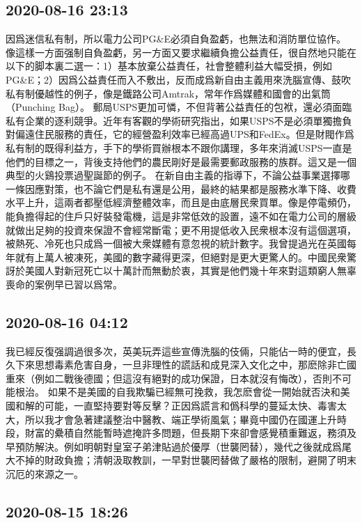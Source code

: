 \documentclass[twocolumn]{ctexart}
\begin{document}
\subsection*{2020-08-16 23:13}

因爲迷信私有制，所以電力公司PG\&E必須自負盈虧，也無法和消防單位協作。
像這樣一方面强制自負盈虧，另一方面又要求繼續負擔公益責任，很自然地只能在以下的脚本裏二選一：1）基本放棄公益責任，社會整體利益大幅受損，例如PG\&E；2）因爲公益責任而入不敷出，反而成爲新自由主義用來洗腦宣傳、鼓吹私有制優越性的例子，像是鐵路公司Amtrak，常年作爲媒體和國會的出氣筒（Punching Bag）。
郵局USPS更加可憐，不但背著公益責任的包袱，還必須面臨私有企業的逐利競爭。近年有客觀的學術研究指出，如果USPS不是必須單獨擔負對偏遠住民服務的責任，它的經營盈利效率已經高過UPS和FedEx。但是財閥作爲私有制的既得利益方，手下的學術買辦根本不跟你講理，多年來消滅USPS一直是他們的目標之一，背後支持他們的農民剛好是最需要郵政服務的族群。這又是一個典型的火鷄投票過聖誕節的例子。
在新自由主義的指導下，不論公益事業選擇哪一條因應對策，也不論它們是私有還是公用，最終的結果都是服務水準下降、收費水平上升，這兩者都壓低經濟整體效率，而且是由底層民衆買單。像是停電頻仍，能負擔得起的住戶只好裝發電機，這是非常低效的設置，遠不如在電力公司的層級就做出足夠的投資來保證不會經常斷電；更不用提低收入民衆根本沒有這個選項，被熱死、冷死也只成爲一個被大衆媒體有意忽視的統計數字。我曾提過光在英國每年就有上萬人被凍死，美國的數字藏得更深，但絕對是更大更驚人的。中國民衆驚訝於美國人對新冠死亡以十萬計而無動於衷，其實是他們幾十年來對這類窮人無辜喪命的案例早已習以爲常。
\subsection*{2020-08-16 04:12}

我已經反復强調過很多次，英美玩弄這些宣傳洗腦的伎倆，只能佔一時的便宜，長久下來思想毒素危害自身，一旦非理性的謊話和成見深入文化之中，那麽除非亡國重來（例如二戰後德國；但這沒有絕對的成功保證，日本就沒有悔改），否則不可能根治。
如果不是美國的自我欺騙已經無可挽救，我怎麽會從一開始就否決和美國和解的可能，一直堅持要對等反擊？正因爲謊言和僞科學的蔓延太快、毒害太大，所以我才會急著建議整治中醫教、端正學術風氣；畢竟中國仍在國運上升時段，財富的纍積自然能暫時遮掩許多問題，但長期下來卻會感覺積重難返，務須及早預防解決。例如明朝對皇室子弟津貼過於優厚（世襲罔替），幾代之後就成爲尾大不掉的財政負擔；清朝汲取教訓，一早對世襲罔替做了嚴格的限制，避開了明末沉厄的來源之一。
\subsection*{2020-08-15 18:26}
\end{document}
